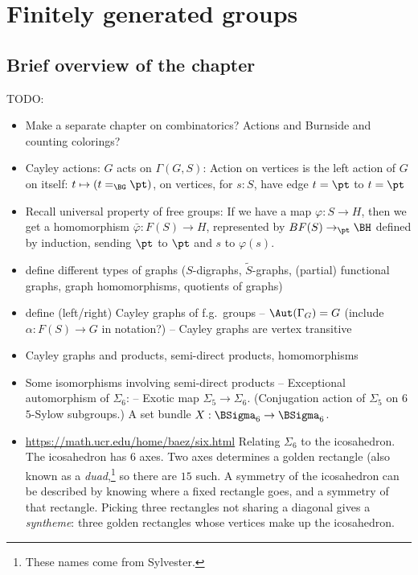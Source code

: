 \chapter{Finitely generated groups}
\label{ch:fggroups}

\section{Brief overview of the chapter}
\label{sec:fggroups-overview}

TODO:
\begin{itemize}
\item Make a separate chapter on combinatorics? Actions and Burnside and counting colorings?
\item Cayley actions: $G$ acts on $\Gamma(G,S)$: Action on vertices is the left action of $G$ on itself: $t \mapsto (t=_{\BG} \pt)$, on vertices, for $s : S$, have edge $t = \pt$ to $t = \pt$
\item Recall universal property of free groups: If we have a map $\varphi : S \to H$, then we get a homomorphism $\bar\varphi : F(S) \to H$, represented by $BF(S) \to_\pt \BH$ defined by induction, sending $\pt$ to $\pt$ and $s$ to $\varphi(s)$.
\item define different types of graphs ($S$-digraphs, $\tilde S$-graphs,
  (partial) functional graphs, graph homomorphisms, quotients of graphs)
\item define (left/right) Cayley graphs of f.g.~groups
  -- $\Aut(\Gamma_G) = G$ (include $\alpha : F(S) \to G$ in notation?)
  -- Cayley graphs are vertex transitive
\item Cayley graphs and products, semi-direct products, homomorphisms
\item Some isomorphisms involving semi-direct products
  -- Exceptional automorphism of $\Sigma_6$:
  -- Exotic map $\Sigma_5 \to \Sigma_6$.
  (Conjugation action of $\Sigma_5$ on $6$ $5$-Sylow subgroups.)
  A set bundle $X : \BSigma_6 \to \BSigma_6$.
\item \url{https://math.ucr.edu/home/baez/six.html}
  Relating $\Sigma_6$ to the icosahedron.
  The icosahedron has $6$ axes. Two axes determines a golden rectangle (also known as a \emph{duad},\footnote{%
    These names come from Sylvester.}
  so there are $15$ such. A symmetry of the icosahedron can be described
  by knowing where a fixed rectangle goes, and a symmetry of that rectangle.
  Picking three rectangles not sharing a diagonal gives a \emph{syntheme}:
  three golden rectangles whose vertices make up the icosahedron.

\end{itemize}
